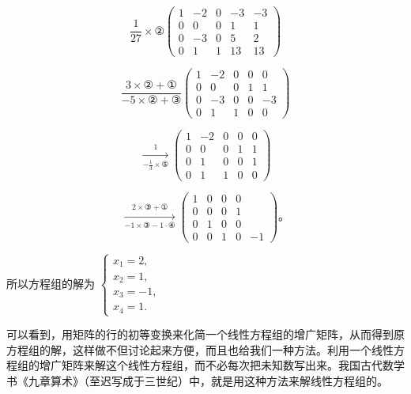 \[
\frac {1}{27} \times ② \left( \begin{array}{ccccc} 1 & - 2 & 0 & - 3 & - 3 \\ 0 & 0 & 0 & 1 & 1 \\ 0 & - 3 & 0 & 5 & 2 \\ 0 & 1 & 1 & 13 & 13 \end{array} \right)
\]

\[
\frac {3 \times ② + ①}{- 5 \times ② + ③} \left( \begin{array}{ccccc} 1 & - 2 & 0 & 0 & 0 \\ 0 & 0 & 0 & 1 & 1 \\ 0 & - 3 & 0 & 0 & - 3 \\ 0 & 1 & 1 & 0 & 0 \end{array} \right)
\]

\[
\xrightarrow [ - \frac {1}{3} \times ⑤ ]{1} \left( \begin{array}{ccccc} 1 & - 2 & 0 & 0 & 0 \\ 0 & 0 & 0 & 1 & 1 \\ 0 & 1 & 0 & 0 & 1 \\ 0 & 1 & 1 & 0 & 0 \end{array} \right)
\]

\[
\xrightarrow [ - 1 \times ③ - 1 \cdot ④ ]{2\times③+①} \left( \begin{array}{ccccc} 1 & 0 & 0 & 0 \\ 0 & 0 & 0 & 1 \\ 0 & 1 & 0 & 0 \\ 0 & 0 & 1 & 0 & - 1 \end{array} \right)\text{。}
\]

所以方程组的解为
\(\left\{ \begin{array}{l} x_{1} = 2, \\ x_{2} = 1, \\ x_{3} = -1, \\ x_{4} = 1. \end{array} \right.\)

可以看到，用矩阵的行的初等变换来化简一个线性方程组的增广矩阵，从而得到原方程组的解，这样做不但讨论起来方便，而且也给我们一种方法。利用一个线性方程组的增广矩阵来解这个线性方程组，而不必每次把未知数写出来。我国古代数学书《九章算术》（至迟写成于三世纪）中，就是用这种方法来解线性方程组的。

